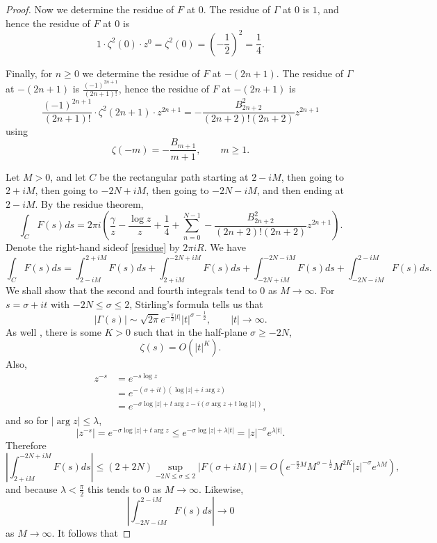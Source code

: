 \documentclass{amsart}
\begin{document}
\begin{proof}
Now we determine the residue of $F$ at $0$. The residue of $\Gamma$ at $0$ is $1$, and 
hence the residue of $F$ at $0$ is 
\[
1 \cdot \zeta^2(0) \cdot z^0 = \zeta^2(0) = \left( -\frac{1}{2} \right)^2 = \frac{1}{4}.
\]

Finally, for $n \geq 0$ we determine the residue of $F$ at $-(2n+1)$. The residue of $\Gamma$ at $-(2n+1)$ is
$\frac{(-1)^{2n+1}}{(2n+1)!}$, hence the residue of $F$ at $-(2n+1)$ is
\[
\frac{(-1)^{2n+1}}{(2n+1)!} \cdot \zeta^2(2n+1) \cdot z^{2n+1} = 
-\frac{B_{2n+2}^2}{(2n+2)!(2n+2)} z^{2n+1}
\]  
using 
\[
\zeta(-m) = -\frac{B_{m+1}}{m+1}, \qquad m \geq 1.
\]


Let $M>0$,
and let $C$ be the rectangular path  starting at $2-iM$, then going to $2+iM$, then going to $-2N+iM$,  then going to $-2N-iM$, and then ending 
at $2-iM$. 
By the residue theorem,
\begin{equation}
\int_C F(s) ds = 2\pi i\left(\frac{\gamma}{z}-\frac{\log z}{z}+\frac{1}{4} + \sum_{n=0}^{N-1}  -\frac{B_{2n+2}^2}{(2n+2)!(2n+2)} z^{2n+1}
\right).
\label{residue}
\end{equation}
Denote the right-hand sideof \eqref{residue}  by $2\pi i R$.
We have
\[
\int_C F(s) ds = 
\int_{2-iM}^{2+iM} F(s) ds + \int_{2+iM}^{-2N+iM} F(s) ds
+ \int_{-2N+iM}^{-2N-iM} F(s) ds +
\int_{-2N-iM}^{2-iM} F(s) ds.
\]
We shall show that the second and fourth integrals tend to $0$ as $M \to \infty$.
For $s=\sigma+it$ with $-2N \leq \sigma \leq 2$, Stirling's formula \cite[p.~151]{titchmarsh}  tells us that
\[
|\Gamma(s)| \sim \sqrt{2\pi} e^{-\frac{\pi}{2} |t|} |t|^{\sigma-\frac{1}{2}}, \qquad |t| \to \infty.
\]
As well \cite[p.~95]{zeta},
there is some $K>0$  such that in the half-plane $\sigma \geq -2N$,
\[
\zeta(s)=O(|t|^K).
\]
Also,
\begin{align*}
z^{-s} &= e^{-s \log z}\\
& = e^{-(\sigma+it)(\log |z|+i\arg z)} \\
&= e^{-\sigma \log|z| + t \arg z - i(\sigma \arg z+t \log|z|)},
\end{align*}
and so for $|\arg z| \leq \lambda$,
\[
|z^{-s}| = e^{-\sigma \log|z| + t \arg z}  \leq e^{-\sigma \log |z|+\lambda |t|} = |z|^{-\sigma} e^{\lambda |t|}.
\]
Therefore
\[
\left| \int_{2+iM}^{-2N+iM} F(s) ds \right| 
\leq (2+2N) \sup_{-2N \leq \sigma \leq 2} |F(\sigma+iM)|
=O(e^{-\frac{\pi}{2} M} M^{\sigma-\frac{1}{2}} M^{2K}  |z|^{-\sigma} e^{\lambda M}),
\]
and because $\lambda<\frac{\pi}{2}$ this tends to $0$ as $M \to \infty$.
Likewise,
\[
\left|\int_{-2N-iM}^{2-iM} F(s) ds \right| \to 0
\]
as $M \to \infty$. It follows that

\end{proof}
\end{document}
